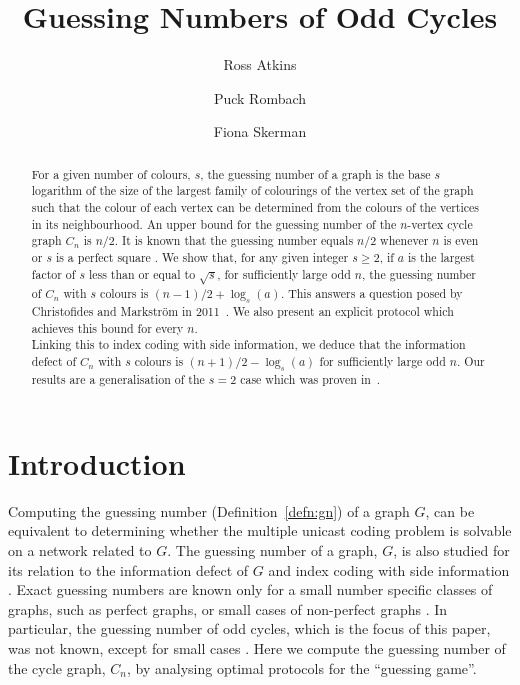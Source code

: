 \documentclass{birkjour}
\title[Guessing Numbers of Odd Cycles]{Guessing Numbers of Odd Cycles}
\author[Atkins]{Ross Atkins}
\author[Rombach]{Puck Rombach}
\author[Skerman]{Fiona Skerman}
\theoremstyle{indenteddefinition}
\theoremstyle{indenteddefinition}
\numberwithin{equation}{section}
\begin{document}
\begin{abstract}
For a given number of colours, $s$, the guessing number of a graph is the base $s$ logarithm of the size of the largest family of colourings of the vertex set of the graph such that the colour of each vertex can be determined from the colours of the vertices in its neighbourhood. An upper bound for the guessing number of the $n$-vertex cycle graph $C_n$ is $n/2$. It is known that the guessing number equals $n/2$ whenever $n$ is even or $s$ is a perfect square \cite{Christofides2011guessing}. We show that, for any given integer $s\geq 2$, if $a$ is the largest factor of $s$ less than or equal to $\sqrt{s}$, for sufficiently large odd $n$, the guessing number of $C_n$ with $s$ colours is $(n-1)/2 + \log_s(a)$. This answers a question posed by Christofides and Markstr\"{o}m in 2011~\cite{Christofides2011guessing}. We also present an explicit protocol which achieves this bound for every $n$. \\ Linking this to index coding with side information, we deduce that the information defect of $C_n$ with $s$ colours is $(n+1)/2 - \log_s(a)$ for sufficiently large odd $n$. Our results are a generalisation of the $s=2$ case which was proven in~\cite{bar2011index}.
\end{abstract}

\maketitle




\section{Introduction}







Computing the guessing number (Definition~\ref{defn:gn}) of a graph $G$, can be equivalent to determining whether the multiple unicast coding problem \cite{Dougherty2006nonreversibility} is solvable on a network related to $G$. The guessing number of a graph, $G$, is also studied for its relation to the information defect of $G$ and index coding with side information \cite{Alon2008broadcasting,Gadouleau2011graph}. Exact guessing numbers are known only for a small number specific classes of graphs, such as perfect graphs, or small cases of non-perfect graphs  \cite{Baber2014graph,Cameron2014guessing,Chang2014linear,Wu2009guessing}.   In particular, the guessing number of odd cycles, which is the focus of this paper, was not known, except for small cases \cite{Christofides2011guessing,bar2011index}. Here we compute the guessing number of the cycle graph, $C_n$, by analysing optimal protocols for the ``guessing game''. 
\end{document}
